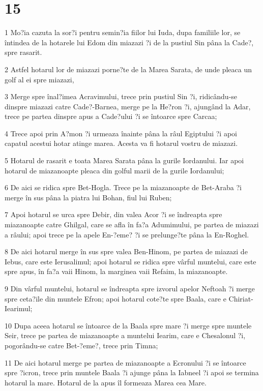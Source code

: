 \chapter{15}

\par 1 Mo?ia cazuta la sor?i pentru semin?ia fiilor lui Iuda, dupa familiile lor, se întindea de la hotarele lui Edom din miazazi ?i de la pustiul Sin pâna la Cade?, spre rasarit.
\par 2 Astfel hotarul lor de miazazi porne?te de la Marea Sarata, de unde pleaca un golf al ei spre miazazi,
\par 3 Merge spre înal?imea Acravimului, trece prin pustiul Sin ?i, ridicându-se dinspre miazazi catre Cade?-Barnea, merge pe la He?ron ?i, ajungând la Adar, trece pe partea dinspre apus a Cade?ului ?i se întoarce spre Carcaa;
\par 4 Trece apoi prin A?mon ?i urmeaza înainte pâna la râul Egiptului ?i apoi capatul acestui hotar atinge marea. Acesta va fi hotarul vostru de miazazi.
\par 5 Hotarul de rasarit e toata Marea Sarata pâna la gurile Iordanului. Iar apoi hotarul de miazanoapte pleaca din golful marii de la gurile Iordanului;
\par 6 De aici se ridica spre Bet-Hogla. Trece pe la miazanoapte de Bet-Araba ?i merge în sus pâna la piatra lui Bohan, fiul lui Ruben;
\par 7 Apoi hotarul se urca spre Debir, din valea Acor ?i se îndreapta spre miazanoapte catre Ghilgal, care se afla în fa?a Adumimului, pe partea de miazazi a râului; apoi trece pe la apele En-?eme? ?i se prelunge?te pâna la En-Roghel.
\par 8 De aici hotarul merge în sus spre valea Ben-Hinom, pe partea de miazazi de Iebus, care este Ierusalimul; apoi hotarul se ridica spre vârful muntelui, care este spre apus, în fa?a vaii Hinom, la marginea vaii Refaim, la miazanoapte.
\par 9 Din vârful muntelui, hotarul se îndreapta spre izvorul apelor Neftoah ?i merge spre ceta?ile din muntele Efron; apoi hotarul cote?te spre Baala, care e Chiriat-Iearimul;
\par 10 Dupa aceea hotarul se întoarce de la Baala spre mare ?i merge spre muntele Seir, trece pe partea de miazanoapte a muntelui Iearim, care e Chesalonul ?i, pogorându-se catre Bet-?eme?, trece prin Timna;
\par 11 De aici hotarul merge pe partea de miazanoapte a Ecronului ?i se întoarce spre ?icron, trece prin muntele Baala ?i ajunge pâna la Iabneel ?i apoi se termina hotarul la mare. Hotarul de la apus îl formeaza Marea cea Mare.
